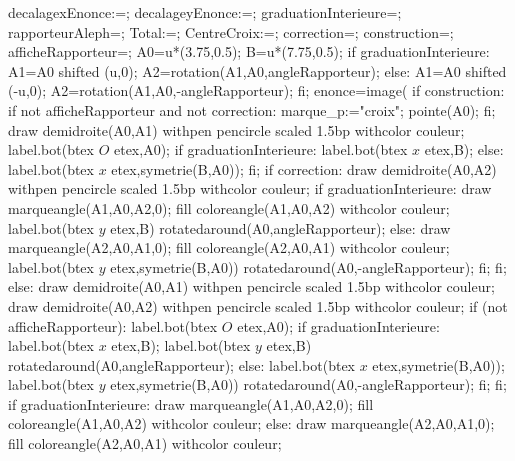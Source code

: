 {\begin{Geometrie}[CoinBG=\RapporteursCoinBG,CoinHD=\RapporteursCoinHD]
    decalagexEnonce:=\RapporteursdecalagexEnonce;
    decalageyEnonce:=\RapporteursdecalageyEnonce;
    graduationInterieure=\RapporteursgraduationInterieure;
    rapporteurAleph=\RapporteursrapporteurAleph;
    Total:=\RapporteursgraduationTotale;%
    CentreCroix:=\RapporteurscentreCroix;%
    correction=\Rapporteurscorrection;
    construction=\Rapporteursconstruction;
    afficheRapporteur=\RapporteursafficheRapporteur;
    A0=u*(3.75,0.5);
    B=u*(7.75,0.5);
    if graduationInterieure:              
       A1=A0 shifted (u,0);
       A2=rotation(A1,A0,angleRapporteur);
    else:
       A1=A0 shifted (-u,0);
       A2=rotation(A1,A0,-angleRapporteur);
    fi;
    enonce=image(
      if construction:
         if not afficheRapporteur and not correction:
            marque_p:="croix";
            pointe(A0);
         fi;
         draw demidroite(A0,A1) withpen pencircle scaled 1.5bp withcolor couleur;
         label.bot(btex $O$ etex,A0);
         if graduationInterieure:
            label.bot(btex $x$ etex,B);
         else:
            label.bot(btex $x$ etex,symetrie(B,A0));
         fi;
         if correction:
            draw demidroite(A0,A2) withpen pencircle scaled 1.5bp withcolor couleur;
            if graduationInterieure:
               draw marqueangle(A1,A0,A2,0);
               fill coloreangle(A1,A0,A2) withcolor couleur;
               label.bot(btex $y$ etex,B) rotatedaround(A0,angleRapporteur);
	         else:
               draw marqueangle(A2,A0,A1,0);
               fill coloreangle(A2,A0,A1) withcolor couleur;
    		      label.bot(btex $y$ etex,symetrie(B,A0)) rotatedaround(A0,-angleRapporteur);
        		fi;
         fi;
      else:
         draw demidroite(A0,A1) withpen pencircle scaled 1.5bp withcolor couleur;
         draw demidroite(A0,A2) withpen pencircle scaled 1.5bp withcolor couleur;
         if (not afficheRapporteur):
            label.bot(btex $O$ etex,A0);
            if graduationInterieure:
               label.bot(btex $x$ etex,B);
               label.bot(btex $y$ etex,B) rotatedaround(A0,angleRapporteur);
            else:
               label.bot(btex $x$ etex,symetrie(B,A0));
               label.bot(btex $y$ etex,symetrie(B,A0)) rotatedaround(A0,-angleRapporteur);
            fi;
         fi;
         if graduationInterieure:
            draw marqueangle(A1,A0,A2,0);
            fill coloreangle(A1,A0,A2) withcolor couleur;
         else:
            draw marqueangle(A2,A0,A1,0);
            fill coloreangle(A2,A0,A1) withcolor couleur;

\end{Geometrie}}
